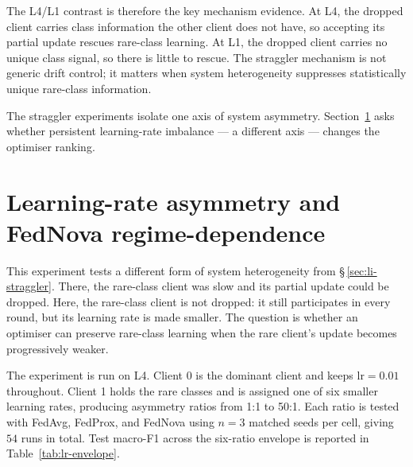 \documentclass[11pt,a4paper]{report}
\begin{document}
The L4/L1 contrast is therefore the key mechanism evidence. At L4, the
dropped client carries class information the other client does not have, so
accepting its partial update rescues rare-class learning. At L1, the dropped
client carries no unique class signal, so there is little to rescue. The
straggler mechanism is not generic drift control; it matters when system
heterogeneity suppresses statistically unique rare-class information.

The straggler experiments isolate one axis of system asymmetry.
Section~\ref{sec:lr-asymmetry} asks whether persistent learning-rate
imbalance --- a different axis --- changes the optimiser ranking.




\section{Learning-rate asymmetry and FedNova regime-dependence}
\label{sec:lr-asymmetry}

This experiment tests a different form of system heterogeneity from
\S\,\ref{sec:li-straggler}. There, the rare-class client was slow and its
partial update could be dropped. Here, the rare-class client is not dropped:
it still participates in every round, but its learning rate is made smaller.
The question is whether an optimiser can preserve rare-class learning when
the rare client's update becomes progressively weaker.

The experiment is run on L4. Client 0 is the dominant client and keeps
$\textrm{lr}=0.01$ throughout. Client 1 holds the rare classes and is assigned
one of six smaller learning rates, producing asymmetry ratios from 1:1 to
50:1. Each ratio is tested with FedAvg, FedProx, and FedNova using $n=3$
matched seeds per cell, giving $54$ runs in total. Test macro-F1 across the
six-ratio envelope is reported in Table~\ref{tab:lr-envelope}.
\end{document}
